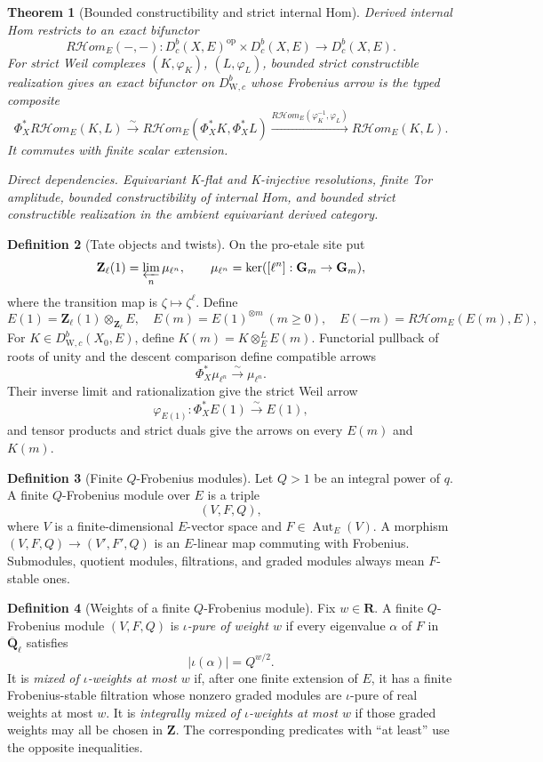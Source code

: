 \documentclass[10pt]{article}
\newtheorem{theorem}{Theorem}[section]
\theoremstyle{definition}
\newtheorem{definition}[theorem]{Definition}
\newcommand{\Qlb}{\overline{\mathbf Q}_\ell}
\newcommand{\Dbc}{D^b_c}
\newcommand{\DW}{D^b_{\mathrm W,c}}
\newcommand{\dep}[1]{\par\smallskip\noindent\textit{Direct dependencies.} #1\par}
\begin{document}
\begin{theorem}[Bounded constructibility and strict internal Hom]
Derived internal Hom restricts to an exact bifunctor
\[
 R\mathcal Hom_E(-,-):\Dbc(X,E)^{\mathrm{op}}\times\Dbc(X,E)
                                      \longrightarrow\Dbc(X,E).
\]
For strict Weil complexes \((K,\varphi_K)\), \((L,\varphi_L)\), bounded
strict constructible realization gives an exact bifunctor on \(\DW\) whose
Frobenius arrow is the typed composite
\[
 \Phi_X^*R\mathcal Hom_E(K,L)
 \xrightarrow{\sim}R\mathcal Hom_E(\Phi_X^*K,\Phi_X^*L)
 \xrightarrow{R\mathcal Hom_E(\varphi_K^{-1},\varphi_L)}
 R\mathcal Hom_E(K,L).
\]
It commutes with finite scalar extension.
\dep{Equivariant K-flat and K-injective resolutions, finite Tor amplitude,
bounded constructibility of internal Hom, and bounded strict constructible
realization in the ambient equivariant derived category.}
\end{theorem}

\begin{definition}[Tate objects and twists]
On the pro-etale site put
\[
 \mathbf Z_\ell(1)=\varprojlim_n\mu_{\ell^n},
 \qquad
 \mu_{\ell^n}=\ker([\ell^n]:\mathbf G_m\to\mathbf G_m),
\]
where the transition map is \(\zeta\mapsto\zeta^\ell\).  Define
\[
 E(1)=\mathbf Z_\ell(1)\otimes_{\mathbf Z_\ell}E,
 \quad E(m)=E(1)^{\otimes m}\ (m\ge0),
 \quad E(-m)=R\mathcal Hom_E(E(m),E),
\]
 For \(K\in\DW(X_0,E)\), define
\(K(m)=K\otimes_E^LE(m)\).  Functorial pullback of roots of unity and
the descent comparison define compatible arrows
\[
 \Phi_X^*\mu_{\ell^n}\xrightarrow{\sim}\mu_{\ell^n}.
\]
Their inverse limit and rationalization give the strict Weil arrow
\[
                  \varphi_{E(1)}:\Phi_X^*E(1)\xrightarrow{\sim}E(1),
\]
and tensor products and strict duals give the arrows on every \(E(m)\) and
\(K(m)\).
\end{definition}

\begin{definition}[Finite \(Q\)-Frobenius modules]
Let \(Q>1\) be an integral power of \(q\).  A finite \(Q\)-Frobenius module
over \(E\) is a triple
\[
                         (V,F,Q),
\]
where \(V\) is a finite-dimensional \(E\)-vector space and
\(F\in\operatorname{Aut}_E(V)\).  A morphism
\((V,F,Q)\to(V',F',Q)\) is an \(E\)-linear map commuting with Frobenius.
Submodules, quotient modules, filtrations, and graded modules always mean
\(F\)-stable ones.
\end{definition}

\begin{definition}[Weights of a finite \(Q\)-Frobenius module]
Fix \(w\in\mathbf R\).  A finite \(Q\)-Frobenius module \((V,F,Q)\) is
\emph{\(\iota\)-pure of weight \(w\)} if every eigenvalue \(\alpha\) of
\(F\) in \(\Qlb\) satisfies
\[
                           |\iota(\alpha)|=Q^{w/2}.
\]
It is \emph{mixed of \(\iota\)-weights at most \(w\)} if, after one finite
extension of \(E\), it has a finite Frobenius-stable filtration whose
nonzero graded modules are \(\iota\)-pure of real weights at most \(w\).
It is \emph{integrally mixed of \(\iota\)-weights at most \(w\)} if those
graded weights may all be chosen in \(\mathbf Z\).  The corresponding
predicates with ``at least'' use the opposite inequalities.
\end{definition}
\end{document}
